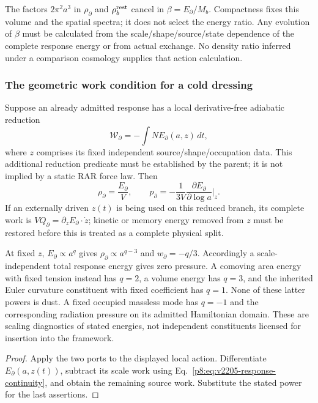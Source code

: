 \documentclass[12pt,a4paper]{article}
\begin{document}
\begin{corollary}
\label{p8:cor:v2205-closed-ratio-not-selected}
The factors $2\pi^2a^3$ in $\rho_\partial$ and
$\rho_b^{\rm rest}$ cancel in $\beta=E_\partial/M_b$.
Compactness fixes this volume and the spatial spectra; it does not select
the energy ratio. Any evolution of $\beta$ must be calculated from the
scale/shape/source/state dependence of the complete response energy or
from actual exchange. No density ratio inferred under a comparison
cosmology supplies that action calculation.
\end{corollary}

\subsubsection{The geometric work condition for a cold dressing}
\begin{proposition}
\label{p8:prop:v2205-geometric-energy-work}
Suppose an already admitted response has a local derivative-free
adiabatic reduction
\[
 \mathcal W_\partial=-\int N E_\partial(a,z)\,dt,
\]
where $z$ comprises its fixed independent source/shape/occupation data.
This additional reduction predicate must be established by the parent;
it is not implied by a static RAR force law. Then
\begin{equation}
\label{p8:eq:v2205-geometric-energy-work}
 \boxed{\rho_\partial=\frac{E_\partial}{V},\qquad
 p_\partial=-\frac1{3V}\frac{\partial E_\partial}{\partial\log a}
                  \bigg|_z.}
\end{equation}
If an externally driven $z(t)$ is being used on this reduced branch, its
complete work is $VQ_\partial=\partial_zE_\partial\cdot\dot z$;
kinetic or memory energy removed from $z$ must be restored before this
is treated as a complete physical split.

At fixed $z$, $E_\partial\propto a^q$ gives
$\rho_\partial\propto a^{q-3}$ and $w_\partial=-q/3$.
Accordingly a scale-independent total response energy gives zero
pressure. A comoving area energy with fixed tension instead has
$q=2$, a volume energy has $q=3$, and the inherited Euler curvature
constituent with fixed coefficient has $q=1$. None of these latter
powers is dust. A fixed occupied massless mode has $q=-1$ and the
corresponding radiation pressure on its admitted Hamiltonian domain.
These are scaling diagnostics of stated energies, not independent
constituents licensed for insertion into the framework.
\end{proposition}
\begin{proof}
Apply the two ports to the displayed local action. Differentiate
$E_\partial(a,z(t))$, subtract its scale work using
Eq.~\eqref{p8:eq:v2205-response-continuity}, and obtain the remaining
source work. Substitute the stated power for the last assertions.
\end{proof}
\end{document}

